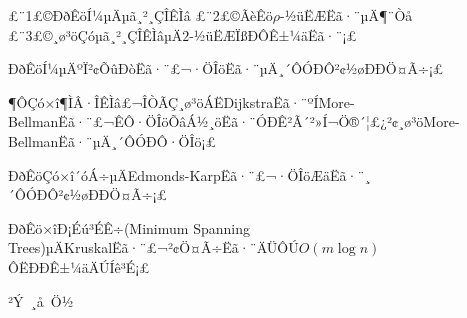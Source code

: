 \newpage
£¨1£©ÐðÊöÍ¼µÄµã¸²¸ÇÎÊÌâ £¨2£©ÃèÊö$\rho$-½üËÆËã·¨µÄ¶¨Òå £¨3£©¸ø³öÇóµã¸²¸ÇÎÊÌâµÄ$2$-½üËÆÏßÐÔÊ±¼äËã·¨¡£


\newpage
{}
ÐðÊöÍ¼µÄºÏ²¢ÕûÐòËã·¨£¬·ÖÎöËã·¨µÄ¸´ÔÓÐÔ²¢½øÐÐÖ¤Ã÷¡£


\newpage
{}
¶ÔÇó×î¶ÌÂ·ÎÊÌâ£¬ÎÒÃÇ¸ø³öÁËDijkstraËã·¨ºÍMore-BellmanËã·¨£¬ÊÔ·ÖÎöÕâÁ½¸öËã·¨ÓÐÊ²Ã´²»Í¬Ö®´¦£¿²¢¸ø³öMore-BellmanËã·¨µÄ¸´ÔÓÐÔ·ÖÎö¡£



\newpage
{}
ÐðÊöÇó×î´óÁ÷µÄEdmonds-KarpËã·¨£¬·ÖÎöÆäËã·¨¸´ÔÓÐÔ²¢½øÐÐÖ¤Ã÷¡£

\newpage
{}ÐðÊö×îÐ¡Éú³ÉÊ÷(Minimum Spanning Trees)µÄKruskalËã·¨£¬²¢Ö¤Ã÷Ëã·¨ÄÜÔÚ$O(m\log n)$ÔËÐÐÊ±¼äÄÚÍê³É¡£





\begin{center}
{\kaishu}
\end{center}

\newpage
\begin{center}
{\kaishu ²Ý~¸å~Ö½}
\end{center}


\lastpg




